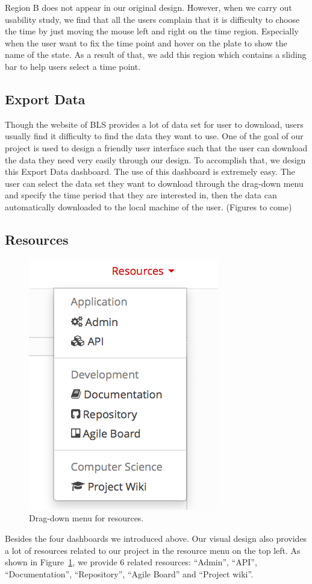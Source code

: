 \documentclass{sigchi}
\begin{document}
Region B does not appear in our original design. However, when we carry out usability study, we find that all the users complain that it is difficulty to choose the time by just moving the mouse left and right on the time region. Especially when the user want to fix the time point and hover on the plate to show the name of the state. As a result of that, we add this region which contains a sliding bar to help users select a time point.


\subsection{Export Data}
Though the website of BLS \cite{Labor_data} provides a lot of data set for user to download, users usually find it difficulty to find the data they want to use. One of the goal of our project is used to design a friendly user interface such that the user can download the data they need very easily through our design. To accomplish that, we design this Export Data dashboard. The use of this dashboard is extremely easy. The user can select the data set they want to download through the drag-down menu and specify the time period that they are interested in, then the data can automatically downloaded to the local machine of the user. (Figures to come)



\subsection{Resources}
\begin{figure}
\centering
\includegraphics[scale=0.8]{figures/resource.png}
\caption{Drag-down menu for resources.}
\label{fig:resource}
\end{figure}
Besides the four dashboards we introduced above. Our visual design also provides a lot of resources related to our project in the resource menu on the top left. As shown in Figure~\ref{fig:resource}, we provide $6$ related resources: ``Admin'', ``API'', ``Documentation'', ``Repository'', ``Agile Board'' and ``Project wiki''.
\end{document}
